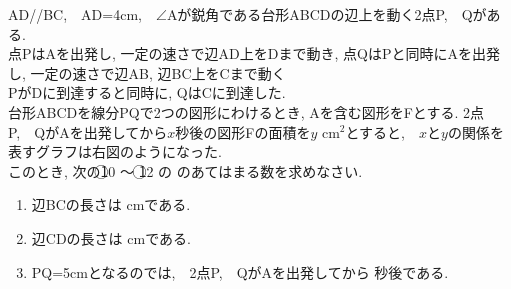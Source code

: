 \documentclass[dvipdfmx, titlepage, 11pt]{jsarticle}
\begin{document}
\begin{minipage}{0.6\hsize}
  \noindent {}\hspace{10pt} AD//BC,\ \ AD=4cm,\ \ $\angle$Aが鋭角である台形ABCDの辺上を動く2点P,\ \ Qがある.\\
  点PはAを出発し, 一定の速さで辺AD上をDまで動き, 点QはPと同時にAを出発し, 一定の速さで辺AB, 辺BC上をCまで動く\\
  PがDに到達すると同時に, QはCに到達した.\\
  台形ABCDを線分PQで2つの図形にわけるとき, Aを含む図形をFとする. 2点P,\ \ QがAを出発してから$x$秒後の図形Fの面積を$y$ cm${}^{2}$とすると,\ \ $x$と$y$の関係を表すグラフは右図のようになった. \\
  このとき, 次の\textcircled{\scriptsize 10} 〜 \textcircled{\scriptsize 12} の \fbox{　\hspace{10pt} } のあてはまる数を求めなさい.\\[2cm]
\end{minipage}
\begin{minipage}{0.35\hsize}
  \begin{center}
  \end{center}
\end{minipage}
\newpage

\begin{enumerate}[(1)]
\item 辺BCの長さは  cmである.\\[4cm]
\item 辺CDの長さは  cmである.\\[4cm]
\item PQ=5cmとなるのでは,\ \ 2点P,\ \ QがAを出発してから  秒後である.
\end{enumerate}
\end{document}
